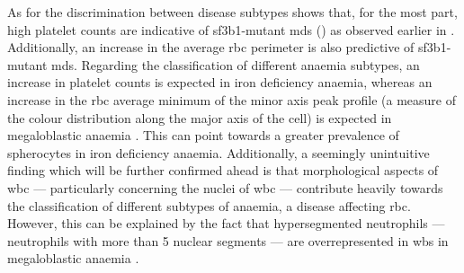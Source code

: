 \begin{figure}[!ht]
    \label{fig:feature-importance-disease-detection-classification}
\end{figure}

As for the discrimination between disease subtypes shows that, for the most part, high platelet counts are indicative of \ac{sf3b1}-mutant \ac{mds} () as observed earlier in . Additionally, an increase in the average \ac{rbc} perimeter is also predictive of \ac{sf3b1}-mutant \ac{mds}. Regarding the classification of different anaemia subtypes, an increase in platelet counts is expected in iron deficiency anaemia, whereas an increase in the \ac{rbc} average minimum of the minor axis peak profile (a measure of the colour distribution along the major axis of the cell) is expected in megaloblastic anaemia . This can point towards a greater prevalence of spherocytes in iron deficiency anaemia. Additionally, a seemingly unintuitive finding which will be further confirmed ahead is that morphological aspects of \ac{wbc} --- particularly concerning the nuclei of \ac{wbc} --- contribute heavily towards the classification of different subtypes of anaemia, a disease affecting \ac{rbc}. However, this can be explained by the fact that hypersegmented neutrophils --- neutrophils with more than 5 nuclear segments --- are overrepresented in \ac{wbs} in megaloblastic anaemia \cite{Hariz2021-qw}.

\begin{figure}[!ht]
    \label{fig:feature-importance-mds}
\end{figure}

\begin{figure}[!ht]
    \label{fig:feature-importance-anaemia}
\end{figure}

